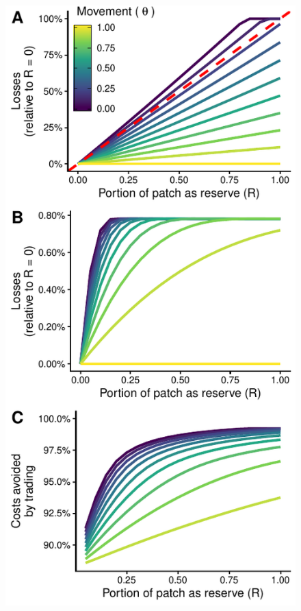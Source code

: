 \documentclass[12pt]{article}
\begin{document}
\begin{figure}[htbp]
\centering
\includegraphics{img/PNA_model.pdf}

\end{figure}
\end{document}
